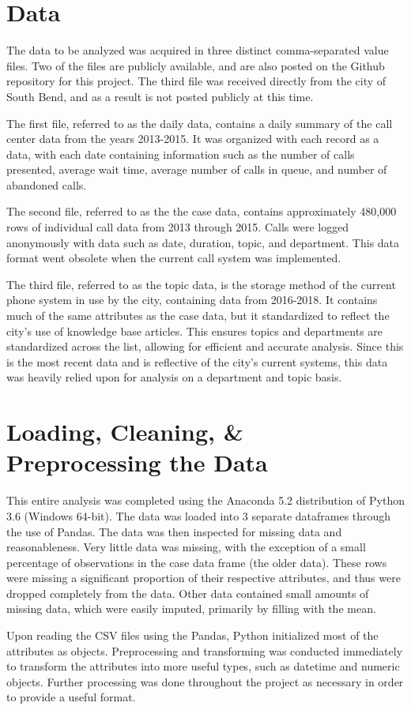 \documentclass[11pt,twocolumn]{article}
\begin{document}
\section{Data}
The data to be analyzed was acquired in three distinct comma-separated value files.  Two of the files are publicly available, and are also posted on the Github repository for this project.  The third file was received directly from the city of South Bend, and as a result is not posted publicly at this time.
\par
The first file, referred to as the daily data, contains a daily summary of the call center data from the years 2013-2015.  It was organized with each record as a data, with each date containing information such as the number of calls presented, average wait time, average number of calls in queue, and number of abandoned calls.
\par
The second file, referred to as the the case data, contains approximately 480,000 rows of individual call data from 2013 through 2015.  Calls were logged anonymously with data such as date, duration, topic, and department.  This data format went obsolete when the current call system was implemented.
\par
The third file, referred to as the topic data, is the storage method of the current phone system in use by the city, containing data from 2016-2018.  It contains much of the same attributes as the case data, but it standardized to reflect the city's use of knowledge base articles.  This ensures topics and departments are standardized across the list, allowing for efficient and accurate analysis.  Since this is the most recent data and is reflective of the city's current systems, this data was heavily relied upon for analysis on a department and topic basis.

\section{Loading, Cleaning, \& Preprocessing the Data}
This entire analysis was completed using the Anaconda 5.2 distribution of Python 3.6 (Windows 64-bit).  The data was loaded into 3 separate dataframes through the use of Pandas.  The data was then inspected for missing data and reasonableness.  Very little data was missing, with the exception of a small percentage of observations in the case data frame (the older data).  These rows were missing a significant proportion of their respective attributes, and thus were dropped completely from the data.  Other data contained small amounts of missing data, which were easily imputed, primarily by filling with the mean.
\par
Upon reading the CSV files using the Pandas, Python initialized most of the attributes as objects.  Preprocessing and transforming was conducted immediately to transform the attributes into more useful types, such as datetime and numeric objects.  Further processing was done throughout the project as necessary in order to provide a useful format.
\end{document}
